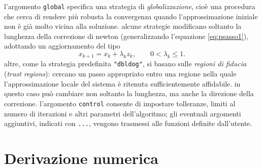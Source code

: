 l'argomento \texttt{global} specifica una strategia di \emph{globalizzazione}, cioè una procedura che cerca di rendere più robusta la convergenza quando l'approssimazione iniziale non è già molto vicina alla soluzione. alcune strategie modificano soltanto la lunghezza della correzione di newton (generalizzando l'equazione \ref{eq:psasso1}), adottando un aggiornamento del tipo
\begin{equation*}
 x_{k+1}=x_k+\lambda_k z_k,
 \qquad 0<\lambda_k\leq 1.
 \label{eq:nleqslv_line_search}
\end{equation*}
altre, come la strategia predefinita \texttt{"dbldog"}, si basano sulle \emph{regioni di fiducia} (\emph{trust regions}): cercano un passo appropriato entro una regione nella quale l'approssimazione locale del sistema è ritenuta sufficientemente affidabile. in questo caso può cambiare non soltanto la lunghezza, ma anche la direzione della correzione. 
l'argomento \texttt{control} consente di impostare tolleranze, limiti al numero di iterazioni e altri parametri dell'algoritmo; gli eventuali argomenti aggiuntivi, indicati con \texttt{...}, vengono trasmessi alle funzioni definite dall'utente.

\section{Derivazione numerica}

